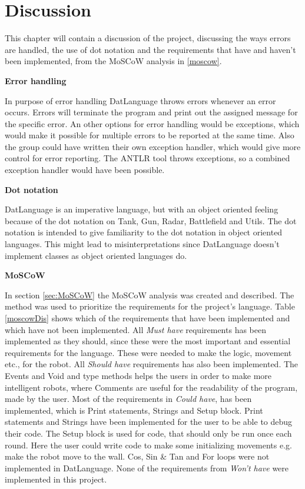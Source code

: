 \chapter{Discussion} \label{chap:Discussion}
This chapter will contain a discussion of the project, discussing the ways errors are handled, the use of dot notation and the requirements that have and haven't been implemented, from the MoSCoW analysis in \ref{moscow}. \newline

\textbf{\Large{Error handling}}

In purpose of error handling DatLanguage throws errors whenever an error occurs. Errors will terminate the program and print out the assigned message for the specific error.
An other options for error handling would be exceptions, which would make it possible for multiple errors to be reported at the same time. Also the group could have written their own exception handler, which would give more control for error reporting. The ANTLR tool throws exceptions, so a combined exception handler would have been possible. \newline

\textbf{\Large{Dot notation}}

DatLanguage is an imperative language, but with an object oriented feeling because of the dot notation on Tank, Gun, Radar, Battlefield and Utils. The dot notation is intended to give familiarity to the dot notation in object oriented languages. This might lead to misinterpretations since DatLanguage doesn't implement classes as object oriented languages do.\newline 

\textbf{\Large{MoSCoW}}

In section \ref{sec:MoSCoW} the MoSCoW analysis was created and described. The method was used to prioritize the requirements for the project's language. Table \ref{moscowDis} shows which of the requirements that have been implemented and which have not been implemented. \newline
All \textit{Must have} requirements has been implemented as they should, since these were the most important and essential requirements for the language. These were needed to make the logic, movement etc., for the robot. \newline
All \textit{Should have} requirements has also been implemented. The Events and Void and type methods helps the users in order to make more intelligent robots, where Comments are useful for the readability of the program, made by the user. \newline
Most of the requirements in \textit{Could have}, has been implemented, which is Print statements, Strings and Setup block. Print statements and Strings have been implemented for the user to be able to debug their code. The Setup block is used for code, that should only be run once each round. Here the user could write code to make some initializing movements e.g. make the  robot move to the wall. Cos, Sin \& Tan and For loops were not implemented in DatLanguage. \newline
None of the requirements from \textit{Won't have} were implemented in this project.

